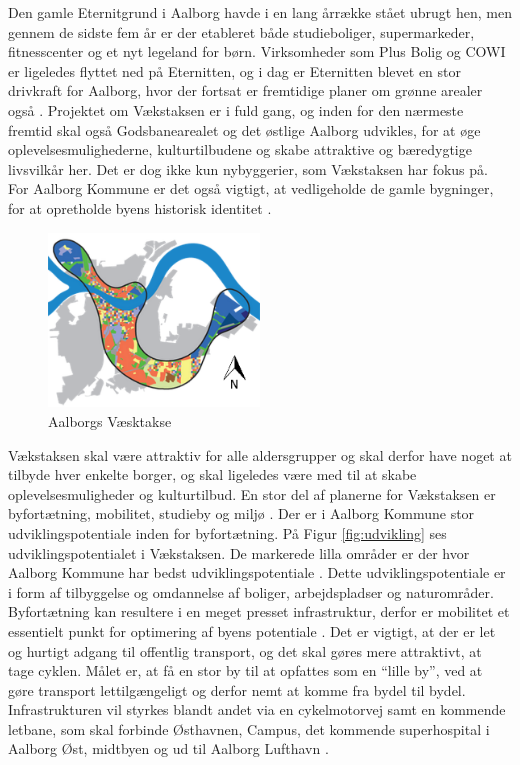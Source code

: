 \newline \indent{     }  Den gamle Eternitgrund i Aalborg havde i en lang årrække stået ubrugt hen, men gennem de sidste fem år er der etableret både studieboliger, supermarkeder, fitnesscenter og et nyt legeland for børn. Virksomheder som Plus Bolig og COWI er ligeledes flyttet ned på Eternitten, og i dag er Eternitten blevet en stor drivkraft for Aalborg,  hvor der fortsat  er fremtidige planer om grønne arealer også \citep{eternitten}.
\newline \indent{     }  Projektet om Vækstaksen er i fuld gang, og inden for den nærmeste fremtid skal også Godsbanearealet og det østlige Aalborg udvikles, for at øge oplevelsesmulighederne, kulturtilbudene og skabe attraktive og bæredygtige livsvilkår her. Det er dog ikke kun nybyggerier, som Vækstaksen har fokus på. For Aalborg Kommune er det også vigtigt, at vedligeholde de gamle bygninger, for at opretholde byens historisk identitet \citep{kommuneplan3}.

\begin{figure}[htbp]
	\centering
	\includegraphics[width=0.5\textwidth]{billeder/vaekstaksen.png}
	\caption{Aalborgs Væsktakse}
	\label{fig:vaekstakse}
\end{figure}

Vækstaksen skal være attraktiv for alle aldersgrupper og skal derfor have noget at tilbyde hver enkelte borger, og skal ligeledes være med til at skabe oplevelsesmuligheder og kulturtilbud.
\newline \indent{     }  En stor del af planerne for Vækstaksen er byfortætning, mobilitet, studieby og miljø \citep{kommuneplan3}. 
Der er i Aalborg Kommune stor udviklingspotentiale inden for byfortætning. På Figur \ref{fig:udvikling} ses udviklingspotentialet i Vækstaksen. De markerede lilla områder er der hvor Aalborg Kommune har bedst udviklingspotentiale \citep{kommuneplan3}.
\newline \indent{     }  Dette udviklingspotentiale er i form af tilbyggelse og omdannelse af boliger, arbejdspladser og naturområder. Byfortætning kan resultere i en meget presset infrastruktur, derfor er mobilitet et essentielt punkt for optimering af byens potentiale \citep{kommuneplan3}. Det er vigtigt, at der er let og hurtigt adgang til offentlig transport, og det skal gøres mere attraktivt, at tage cyklen. Målet er, at få en stor by til at opfattes som en “lille by”, ved at gøre transport lettilgængeligt og derfor nemt at komme fra bydel til bydel. Infrastrukturen vil styrkes blandt andet via en cykelmotorvej samt en kommende letbane, som skal forbinde Østhavnen, Campus, det kommende superhospital i Aalborg Øst, midtbyen og ud til Aalborg Lufthavn \citep{kommuneplan3}.


